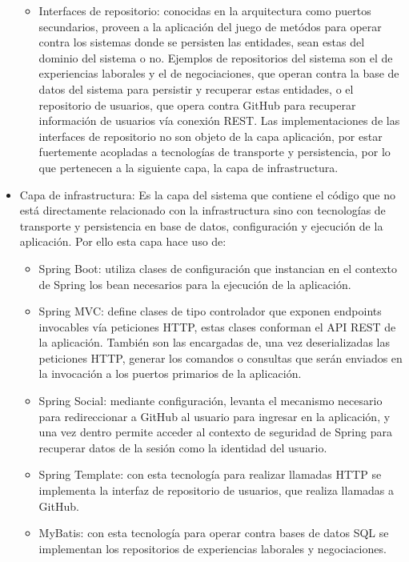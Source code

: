 \documentclass[a4paper, 12pt]{book}
\begin{document}
\begin{itemize}
\begin{itemize}
	\item Interfaces de repositorio: conocidas en la arquitectura como puertos secundarios, proveen a la aplicación del juego de metódos para operar contra los sistemas donde se persisten las entidades, sean estas del dominio del sistema o no. 
	Ejemplos de repositorios del sistema son el de experiencias laborales y el de negociaciones, que operan contra la base de datos del sistema para persistir y recuperar estas entidades, o el repositorio de usuarios, que opera contra GitHub para recuperar información de usuarios vía conexión REST.
	Las implementaciones de las interfaces de repositorio no son objeto de la capa aplicación, por estar fuertemente acopladas a tecnologías de transporte y persistencia, por lo que pertenecen a la siguiente capa, la capa de infrastructura.
	\end{itemize}


  \item Capa de infrastructura: Es la capa del sistema que contiene el código que no está directamente relacionado con la infrastructura sino con tecnologías de transporte y persistencia en base de datos, configuración y ejecución de la aplicación. 
Por ello esta capa hace uso de:

	\begin{itemize}
	\item Spring Boot: utiliza clases de configuración que instancian en el contexto de Spring los bean necesarios para la ejecución de la aplicación.

	\item Spring MVC: define clases de tipo controlador que exponen endpoints invocables vía peticiones HTTP, estas clases conforman el API REST de la aplicación. También son las encargadas de, una vez deserializadas las peticiones HTTP, generar los comandos o consultas que serán enviados en la invocación a los puertos primarios de la aplicación.

	\item Spring Social: mediante configuración, levanta el mecanismo necesario para redireccionar a GitHub al usuario para ingresar en la aplicación, y una vez dentro permite acceder al contexto de seguridad de Spring para recuperar datos de la sesión como la identidad del usuario.

	\item Spring Template: con esta tecnología para realizar llamadas HTTP se implementa la interfaz de repositorio de usuarios, que realiza llamadas a GitHub.

	\item MyBatis: con esta tecnología para operar contra bases de datos SQL se implementan los repositorios de experiencias laborales y negociaciones.

	\end{itemize}
  
\end{itemize}
\end{document}
